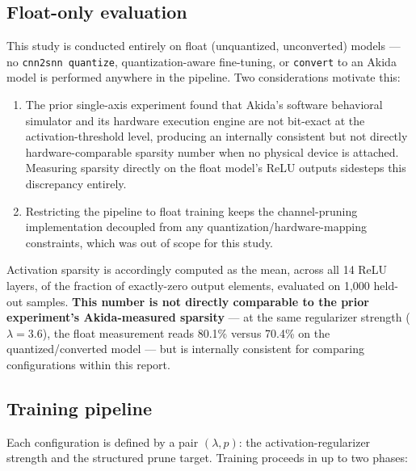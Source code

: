 \documentclass[11pt]{article}
\newcommand{\code}[1]{\texttt{#1}}
\begin{document}
\subsection{Float-only evaluation}

This study is conducted entirely on float (unquantized, unconverted) models --- no \code{cnn2snn quantize}, quantization-aware fine-tuning, or \code{convert} to an Akida model is performed anywhere in the pipeline. Two considerations motivate this:

\begin{enumerate}[label=(\alph*)]
    \item The prior single-axis experiment found that Akida's software behavioral simulator and its hardware execution engine are not bit-exact at the activation-threshold level, producing an internally consistent but not directly hardware-comparable sparsity number when no physical device is attached. Measuring sparsity directly on the float model's ReLU outputs sidesteps this discrepancy entirely.
    \item Restricting the pipeline to float training keeps the channel-pruning implementation decoupled from any quantization/hardware-mapping constraints, which was out of scope for this study.
\end{enumerate}

Activation sparsity is accordingly computed as the mean, across all 14 ReLU layers, of the fraction of exactly-zero output elements, evaluated on 1{,}000 held-out samples. \textbf{This number is not directly comparable to the prior experiment's Akida-measured sparsity} --- at the same regularizer strength ($\lambda=3.6$), the float measurement reads 80.1\% versus 70.4\% on the quantized/converted model --- but is internally consistent for comparing configurations within this report.

\subsection{Training pipeline}

Each configuration is defined by a pair $(\lambda, p)$: the activation-regularizer strength and the structured prune target. Training proceeds in up to two phases:
\end{document}

